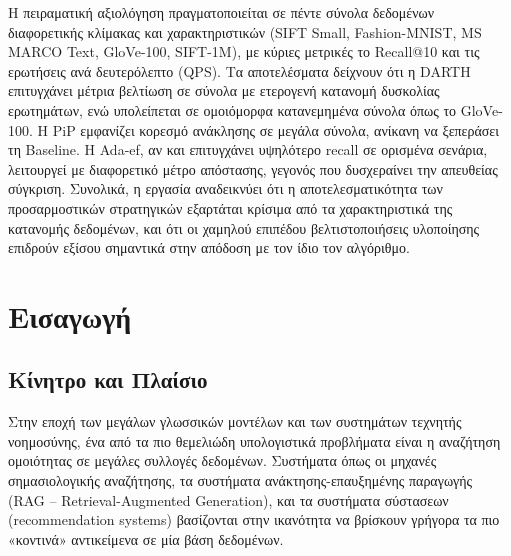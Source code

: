 \documentclass[12pt,a4paper]{article}
\begin{document}
Η πειραματική αξιολόγηση πραγματοποιείται σε πέντε σύνολα δεδομένων διαφορετικής κλίμακας και χαρακτηριστικών (SIFT Small, Fashion-MNIST, MS MARCO Text, GloVe-100, SIFT-1M), με κύριες μετρικές το Recall@10 και τις ερωτήσεις ανά δευτερόλεπτο (QPS). Τα αποτελέσματα δείχνουν ότι η DARTH επιτυγχάνει μέτρια βελτίωση σε σύνολα με ετερογενή κατανομή δυσκολίας ερωτημάτων, ενώ υπολείπεται σε ομοιόμορφα κατανεμημένα σύνολα όπως το GloVe-100. Η PiP εμφανίζει κορεσμό ανάκλησης σε μεγάλα σύνολα, ανίκανη να ξεπεράσει τη Baseline. Η Ada-ef, αν και επιτυγχάνει υψηλότερο recall σε ορισμένα σενάρια, λειτουργεί με διαφορετικό μέτρο απόστασης, γεγονός που δυσχεραίνει την απευθείας σύγκριση. Συνολικά, η εργασία αναδεικνύει ότι η αποτελεσματικότητα των προσαρμοστικών στρατηγικών εξαρτάται κρίσιμα από τα χαρακτηριστικά της κατανομής δεδομένων, και ότι οι χαμηλού επιπέδου βελτιστοποιήσεις υλοποίησης επιδρούν εξίσου σημαντικά στην απόδοση με τον ίδιο τον αλγόριθμο.
\newpage
\tableofcontents

\newpage

\newpage
\section{Εισαγωγή}

\subsection{Κίνητρο και Πλαίσιο}

Στην εποχή των μεγάλων γλωσσικών μοντέλων και των συστημάτων τεχνητής νοημοσύνης, ένα από τα πιο θεμελιώδη υπολογιστικά προβλήματα είναι η αναζήτηση ομοιότητας σε μεγάλες συλλογές δεδομένων. Συστήματα όπως οι μηχανές σημασιολογικής αναζήτησης, τα συστήματα ανάκτησης-επαυξημένης παραγωγής (RAG -- Retrieval-Augmented Generation), και τα συστήματα σύστασεων (recommendation systems) βασίζονται στην ικανότητα να βρίσκουν γρήγορα τα πιο «κοντινά» αντικείμενα σε μία βάση δεδομένων.
\end{document}
